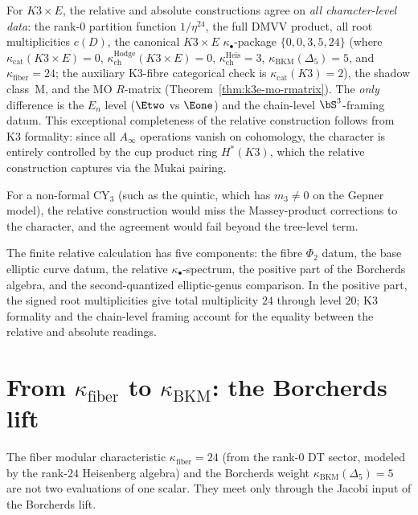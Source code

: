 \begin{remark}
\label{rem:k3xe-well-behaved-standalone}
For $K3 \times E$, the relative and absolute constructions agree on
\emph{all character-level data}: the rank-$0$ partition function
$1/\eta^{24}$, the full DMVV product, all root multiplicities $c(D)$,
the canonical $K3\times E$ $\kappa_\bullet$-package $\{0, 0, 3, 5, 24\}$
(where $\kappa_{\mathrm{cat}}(K3 \times E) = 0$,
$\kappa_{\mathrm{ch}}^{\mathrm{Hodge}}(K3 \times E) = 0$,
$\kappa_{\mathrm{ch}}^{\mathrm{Heis}} = 3$,
$\kappa_{\mathrm{BKM}}(\Delta_5) = 5$, and
$\kappa_{\mathrm{fiber}} = 24$; the auxiliary K3-fibre categorical
check is $\kappa_{\mathrm{cat}}(K3)=2$), the shadow class~M,
and the MO $R$-matrix (Theorem~\ref{thm:k3e-mo-rmatrix}). The
\emph{only} difference is the $E_n$ level ($\Etwo$ vs $\Eone$) and
the chain-level $\bS^3$-framing datum. This exceptional completeness
of the relative construction follows from K3 formality: since all
$A_\infty$ operations vanish on cohomology, the character is entirely
controlled by the cup product ring $H^*(K3)$, which the relative
construction captures via the Mukai pairing.

For a non-formal CY$_3$ (such as the quintic, which has $m_3 \neq 0$
on the Gepner model), the relative construction would miss the
Massey-product corrections to the character, and the agreement would
fail beyond the tree-level term.
\end{remark}
The finite relative calculation has five components: the fibre
$\Phi_2$ datum, the base elliptic curve datum, the relative
$\kappa_\bullet$-spectrum, the positive part of the Borcherds algebra,
and the second-quantized elliptic-genus comparison. In the positive
part, the signed root multiplicities give total multiplicity \(24\)
through level \(20\); K3 formality and the chain-level framing account
for the equality between the relative and absolute readings.


\section{From \texorpdfstring{$\kappa_{\mathrm{fiber}}$}{kappa-fib} to \texorpdfstring{$\kappa_{\mathrm{BKM}}$}{kappa-BKM}: the Borcherds lift}
\label{sec:k3e-fiber-to-global}

The fiber modular characteristic $\kappa_{\mathrm{fiber}} = 24$ (from the rank-$0$ DT sector, modeled by the rank-$24$ Heisenberg algebra) and the Borcherds weight $\kappa_{\mathrm{BKM}}(\Delta_5) = 5$ are not two evaluations of one scalar. They meet only through the Jacobi input of the Borcherds lift.

